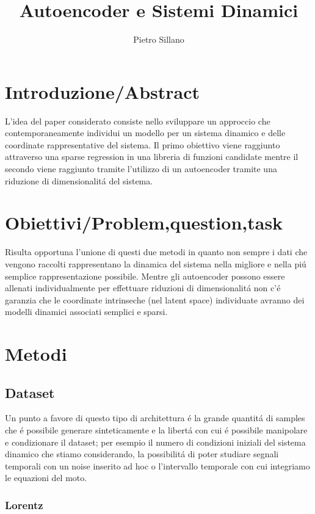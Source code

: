 \documentclass[11pt]{article}
\title{Autoencoder e Sistemi Dinamici}
\author{Pietro Sillano}
\begin{document}
\maketitle
\nocite{1} 
\nocite{2} 



\section{Introduzione/Abstract}
L'idea del paper considerato consiste nello sviluppare un approccio che contemporaneamente individui un modello per un sistema dinamico e delle coordinate rappresentative del sistema.
Il primo obiettivo viene raggiunto attraverso una sparse regression in una libreria di funzioni candidate mentre il secondo viene raggiunto tramite l'utilizzo di un autoencoder tramite una riduzione di dimensionalitá del sistema.
\section{Obiettivi/Problem,question,task}
Risulta opportuna l'unione di questi due metodi in quanto non sempre i dati che vengono raccolti rappresentano la dinamica del sistema nella migliore e nella piú semplice rappresentazione possibile. 
Mentre gli autoencoder possono essere allenati individualmente per effettuare riduzioni di dimensionalitá non c'é garanzia che le coordinate intrinseche (nel latent space) individuate avranno dei modelli dinamici associati semplici e sparsi.


\section{Metodi}

\subsection{Dataset}
Un punto a favore di questo tipo di architettura é la grande quantitá di samples che é possibile generare sinteticamente e la libertá con cui é possibile manipolare e condizionare il dataset; per esempio il numero di condizioni iniziali del sistema dinamico che stiamo considerando, la possibilitá di poter studiare segnali temporali con un noise inserito ad hoc o l'intervallo temporale con cui integriamo le equazioni del moto.

\subsubsection{Lorentz}
\end{document}
